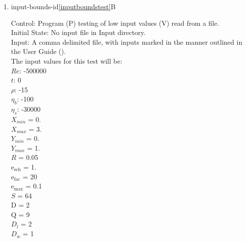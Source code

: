 \documentclass[12pt, titlepage]{article}
\newcommand{\famname}{Lattice Boltzmann Solver}
\begin{document}
\begin{enumerate}
Test Case Derivation: 
I (individual inputs) are an element of V. P(V) is incorrect if P:V and at least one I is out of bounds as per Table \ref{table:inputdatabounds}: Input Data Bounds. This test satisfies R3.\\ 

					
How test will be performed: 

\begin{enumerate}
\item Outside of the system, the input values will be written to a comma delimited text file titled input.txt, as outlined in the User Guide (\citet{LBM_UserGuide_PM}).
\item The file will be placed into the Input directory, under the home directory of the project.
\item {\famname} will be run.
\item If the test is successful, the system will output a descriptive error message, as seen above, to the screen.\\


\end{enumerate}

\item{input-bounds-id\ref{inputboundstest}B\\}

Control: Program (P) testing of low input values (V) read from a file.\\

Initial State: No input file in Input directory.\\

Input: A comma delimited file, with inputs marked in the manner outlined in the User Guide (\citet{LBM_UserGuide_PM}).\\The input values for this test will be:\\$Re$: -500000\\
$t$: 0\\
$\rho$: -15\\
$\eta_b$: -100\\
$\eta_s$: -30000\\
$X_{min}$ = 0.\\
$X_{max}$ = 3.\\
$Y_{min}$ = 0.\\
$Y_{max}$ = 1.\\
$R$ = 0.05\\
$\mathrm{e_{sch}}$ = 1.\\
$\mathrm{e_{fac}}$ = 20\\
$\mathrm{e_{max}}$ = 0.1\\
$S$ = 64\\
$\mathrm{D}$ = 2\\
$\mathrm{Q}$ = 9\\
$D_{l}$ = 2\\
$D_{w}$ = 1\\



\end{enumerate}
\end{document}
